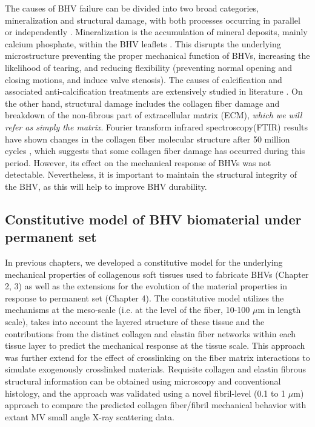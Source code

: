 	The causes of BHV failure can be divided into two broad categories, mineralization and structural damage, with both processes occurring in parallel or independently \cite{sacks_collagen_2002}. Mineralization is the accumulation of mineral deposits, mainly calcium phosphate, within the BHV leaflets \cite{schoen_calcification_2005}. This disrupts the underlying microstructure preventing the proper mechanical function of BHVs, increasing the likelihood of tearing, and reducing flexibility (preventing normal opening and closing motions, and induce valve stenosis). The causes of calcification and associated anti-calcification treatments are extensively studied in literature \cite{park_novel_1997, isenburg_tannic_2005, vyavahare_prevention_1997}. On the other hand, structural damage includes the collagen fiber damage and breakdown of the non-fibrous part of extracellular matrix (ECM), \emph{which we will refer as simply the matrix}. Fourier transform infrared spectroscopy(FTIR) results have shown changes in the collagen fiber molecular structure after 50 million cycles \cite{sun_response_2004}, which suggests that some collagen fiber damage has occurred during this period. However, its effect on the mechanical response of BHVs was not detectable. Nevertheless, it is important to maintain the structural integrity of the BHV, as this will help to improve BHV durability.
	

\subsection{Constitutive model of BHV biomaterial under permanent set}

    In previous chapters, we developed a constitutive model for the underlying mechanical properties of collagenous soft tissues used to fabricate BHVs (Chapter 2, 3) as well as the extensions for the evolution of the material properties in response to permanent set (Chapter 4). The constitutive model utilizes the mechanisms at the meso-scale (i.e. at the level of the fiber, 10-100 $\mu$m in length scale), takes into account the layered structure of these tissue and the contributions from the distinct collagen and elastin fiber networks within each tissue layer to predict the mechanical response at the tissue scale. This approach was further extend for the effect of crosslinking on the fiber matrix interactions to simulate exogenously crosslinked materials. Requisite collagen and elastin fibrous structural information can be obtained using microscopy and conventional histology, and the approach was validated using a novel fibril-level (0.1 to 1 $\mu$m) approach to compare the predicted collagen fiber/fibril mechanical behavior with extant MV small angle X-ray scattering data. 
    
